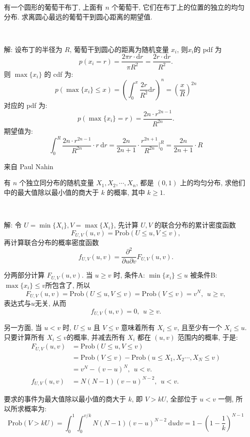 有一个圆形的葡萄干布丁, 上面有 $n$ 个葡萄干, 它们在布丁上的位置的独立的均匀分布. 求离圆心最远的葡萄干到圆心距离的期望值.

~

解: 设布丁的半径为 $R$, 葡萄干到圆心的距离为随机变量 $x_i$, 则$x_i$的 pdf 为
\[p(x_i=r) = \frac{2\pi r\cdot\mathrm{d}r}{\pi R^2} = \frac{2r\cdot\mathrm{d}r}{R^2}.\]
则 $\max\{x_i\}$ 的 cdf 为:
\[p(\max\{x_i\} \le x) = \left( \int_0^x{\frac{2r}{R^2} \mathrm{d}r}\right)^n = \left(\frac{x}{R}\right)^{2n}\]
对应的 pdf 为: 
\[p(\max\{x_i\} = r) = \frac{2n\cdot r^{2n-1}}{R^{2n}} .\]
期望值为:
\[\int_0^R{\frac{2n\cdot r^{2n-1}}{R^{2n}}\cdot r}\ \mathrm{d}r = \frac{2n}{2n+1}\cdot \frac{r^{2n+1}}{R^{2n}}\bigg|_0^R = \frac{2n}{2n+1}\cdot R\]



\newpage

\noindent 来自 Paul Nahin

有 $n$ 个独立同分布的随机变量 $X_1, X_2, \cdots, X_n$, 都是 $(0,1)$ 上的均匀分布, 求他们中的最大值除以最小值的商大于 $k$ 的概率, 其中 $k \ge 1$.

~

解: 令 $U = \min\{X_i\}, V = \max\{X_i\}$, 先计算 $U,V$ 的联合分布的累计密度函数 
$$F_{U,V}(u,v) = \mathrm{Prob}(U\le u, V\le v) ,$$ 
再计算联合分布的概率密度函数 
$$f_{U,V}(u,v) = \frac{\partial^2}{\partial u\partial v}F_{U,V}(u,v). $$

分两部分计算 $F_{U,V}(u,v)$. 当 $u\ge v$ 时, 条件A: $\min\{x_i\}\le u$ 被条件B: $\max\{x_i\}\le v$所包含了, 所以 
$$F_{U,V}(u,v) = \mathrm{Prob}(U\le u, V\le v) = \mathrm{Prob}(V\le v) = v^N,\ \ u\ge v , $$ 
表达式与$u$无关, 从而
$$f_{U,V}(u,v) = 0,\ \ u\ge v .$$

另一方面, 当 $u < v$ 时, $U\le u$ 且 $V\le v$ 意味着所有 $X_i \le v$, 且至少有一个 $X_i \le u$. 只要计算所有 $X_i \le v$的概率, 并减去所有 $X_i$ 都在 $(u,v)$ 范围内的概率, 于是:
\begin{align*}
F_{U,V}(u,v) &= \mathrm{Prob}(U\le u, V\le v) \\
&= \mathrm{Prob}(V\le v) - \mathrm{Prob}(u\le X_1,X_2\cdots,X_N\le v) \\
&= v^N - (v-u)^N,\ \ u < v.\\
f_{U,V}(u,v) &= N(N-1)(v-u)^{N-2}, \ \ u < v.
\end{align*}

要求的事件为最大值除以最小值的商大于 $k$, 即 $V > kU$, 全部位于 $u<v$ 一侧, 所以所求概率为:
\[
\mathrm{Prob}(V > kU) = \int_0^1\int_0^{v/k}{N(N-1)(v-u)^{N-2}}\ \mathrm{d}u\mathrm{d}v = 1 - \left(1 - \frac{1}{k}\right)^{N-1}
\]

